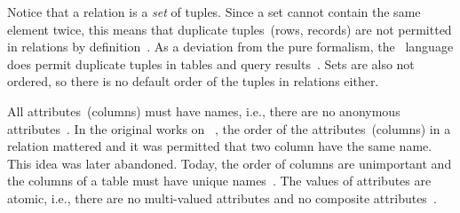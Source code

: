 Notice that a relation is a \emph{set} of tuples.
Since a set cannot contain the same element twice, this means that duplicate tuples~(rows, records) are not permitted in relations by definition~\cite{C20245YOQ}.
As a deviation from the pure formalism, the \sql\ language does permit duplicate tuples in tables and query results~\cite{C20245YOQ}.
Sets are also not ordered, so there is no default order of the tuples in relations either.

All attributes~(columns) must have names, i.e., there are no anonymous attributes~\cite{S2024D:LDMRMRA}.
In the original works on ~\cite{C1970ARMODFLSDB}, the order of the attributes~(columns) in a relation mattered and it was permitted that two column have the same name.
This idea was later abandoned.
Today, the order of columns are unimportant and the columns of a table must have unique names~\cite{S2024D:LDMRMRA}.
The values of attributes are atomic, i.e., there are no multi-valued attributes and no composite attributes~\cite{S2024D:LDMRMRA,SS2005EIDDDFDB:SDLDUTRDM}.

